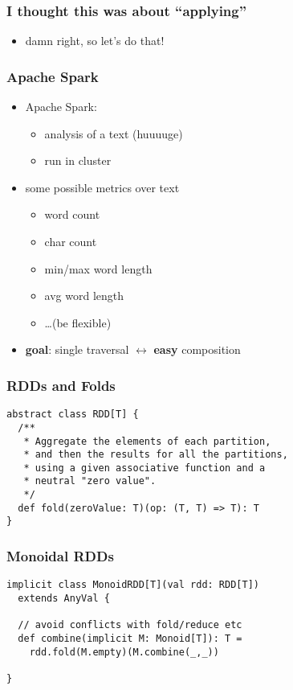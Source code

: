 \documentclass{beamer}
\begin{document}
\begin{frame}
  \frametitle{I thought this was about ``applying''}
  \begin{itemize}
  \item damn right, so let's do that!
  \end{itemize}
\end{frame}

\begin{frame}
  \frametitle{Apache Spark}
  \begin{itemize}
  \item Apache Spark:
    \begin{itemize}
    \item analysis of a text (huuuuge)
    \item run in cluster
    \end{itemize}
  \item some possible metrics over text
    \begin{itemize}
    \item word count
    \item char count
    \item min/max word length
    \item avg word length
    \item \dots (be flexible)
    \end{itemize}
  \item \textbf{goal}: single traversal $\leftrightarrow$ \textbf{easy} composition
  \end{itemize}
\end{frame}

\begin{frame}[fragile]
  \frametitle{RDDs and Folds}
\begin{verbatim}
abstract class RDD[T] {
  /**
   * Aggregate the elements of each partition,
   * and then the results for all the partitions,
   * using a given associative function and a
   * neutral "zero value".
   */
  def fold(zeroValue: T)(op: (T, T) => T): T
}
\end{verbatim}
\end{frame}

\begin{frame}[fragile]
  \frametitle{Monoidal RDDs}
\begin{verbatim}
implicit class MonoidRDD[T](val rdd: RDD[T])
  extends AnyVal {

  // avoid conflicts with fold/reduce etc
  def combine(implicit M: Monoid[T]): T =
    rdd.fold(M.empty)(M.combine(_,_))

}
\end{verbatim}
\end{frame}
\end{document}
